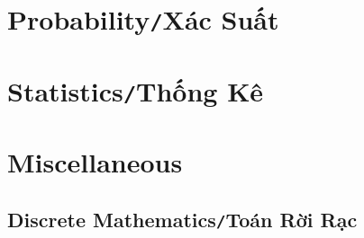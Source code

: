 \documentclass{article}
\numberwithin{equation}{section}
\begin{document}
\section{Probability\texttt{/}Xác Suất}

\section{Statistics\texttt{/}Thống Kê}

\section{Miscellaneous}

\subsection{Discrete Mathematics\texttt{/}Toán Rời Rạc}
\end{document}
